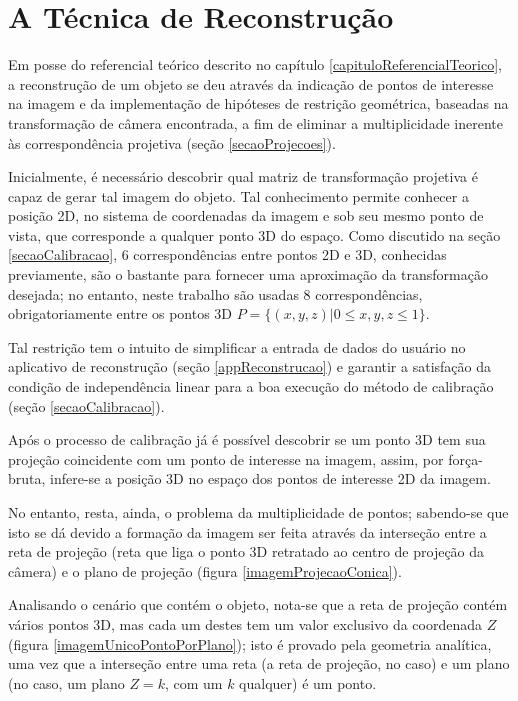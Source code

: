 \chapter{A Técnica de Reconstrução}
	\label{capituloReconstrucao}

	Em posse do referencial teórico descrito no capítulo \ref{capituloReferencialTeorico}, a reconstrução de um objeto se deu através da indicação de pontos de interesse na imagem e da implementação de hipóteses de restrição geométrica, baseadas na transformação de câmera encontrada, a fim de eliminar a multiplicidade inerente às correspondência projetiva (seção \ref{secaoProjecoes}).

	Inicialmente, é necessário descobrir qual matriz de transformação projetiva é capaz de gerar tal imagem do objeto. Tal conhecimento permite conhecer a posição 2D, no sistema de coordenadas da imagem e sob seu mesmo ponto de vista, que corresponde a qualquer ponto 3D do espaço. Como discutido na seção \ref{secaoCalibracao}, 6 correspondências entre pontos 2D e 3D, conhecidas previamente, são o bastante para fornecer uma aproximação da transformação desejada; no entanto, neste trabalho são usadas 8 correspondências, obrigatoriamente entre os pontos 3D $P = \{(x, y, z) | 0 \leq x, y, z \leq 1\}$.
	
	Tal restrição tem o intuito de simplificar a entrada de dados do usuário no aplicativo de reconstrução (seção \ref{appReconstrucao}) e garantir a satisfação da condição de independência linear para a boa execução do método de calibração (seção \ref{secaoCalibracao}).
	
	Após o processo de calibração já é possível descobrir se um ponto 3D tem sua projeção coincidente com um ponto de interesse na imagem, assim, por força-bruta, infere-se a posição 3D no espaço dos pontos de interesse 2D da imagem. 
	
	No entanto, resta, ainda, o problema da multiplicidade de pontos; sabendo-se que isto se dá devido a formação da imagem ser feita através da interseção entre a reta de projeção (reta que liga o ponto 3D retratado ao centro de projeção da câmera) e o plano de projeção (figura \ref{imagemProjecaoConica}).
	
	Analisando o cenário que contém o objeto, nota-se que a reta de projeção contém vários pontos 3D, mas cada um destes tem um valor exclusivo da coordenada $Z$ (figura \ref{imagemUnicoPontoPorPlano}); isto é provado pela geometria analítica, uma vez que a interseção entre uma reta (a reta de projeção, no caso) e um plano (no caso, um plano $Z = k$, com um $k$ qualquer) é um ponto.
	

